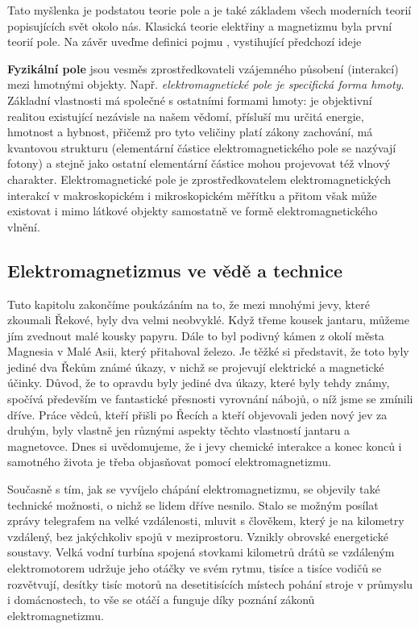       Tato myšlenka je podstatou teorie pole a je také základem všech moderních teorií popisujících
      svět okolo nás. Klasická teorie elektřiny a magnetizmu byla první teorií pole. Na závěr uveďme
      definici pojmu , vystihující předchozí ideje
      \begin{tcnote}
        \textbf{Fyzikální pole} jsou vesměs zprostředkovateli vzájemného působení (interakcí) mezi
        hmotnými objekty. Např. \emph{elektromagnetické pole je specifická forma hmoty}. Základní
        vlastnosti má společné s ostatními formami hmoty: je objektivní realitou existující
        nezávisle na našem vědomí, přísluší mu určitá energie, hmotnost a hybnost, přičemž pro tyto
        veličiny platí zákony zachování, má kvantovou strukturu (elementární částice
        elektromagnetického pole se nazývají fotony) a stejně jako ostatní elementární částice mohou
        projevovat též vlnový charakter. Elektromagnetické pole je zprostředkovatelem
        elektromagnetických interakcí v makroskopickém i mikroskopickém měřítku a přitom však může
        existovat i mimo látkové objekty samostatně ve formě elektromagnetického vlnění.
      \end{tcnote}               

    \subsection{Elektromagnetizmus ve vědě a technice}  
      Tuto kapitolu zakončíme poukázáním na to, že mezi mnohými jevy, které zkoumali Řekové, byly
      dva velmi neobvyklé. Když třeme kousek jantaru, můžeme jím zvednout malé kousky papyru. Dále
      to byl podivný kámen z okolí města Magnesia v Malé Asii, který přitahoval železo. Je těžké si
      představit, že toto byly jediné dva Řekům známé úkazy, v nichž se projevují elektrické a
      magnetické účinky. Důvod, že  to opravdu byly jediné dva úkazy, které byly tehdy známy,
      spočívá především ve fantastické přesnosti vyrovnání nábojů, o níž jsme se zmínili dříve.
      Práce vědců, kteří přišli po Řecích a kteří objevovali jeden nový jev za druhým, byly vlastně
      jen různými aspekty těchto vlastností jantaru a magnetovce. Dnes si uvědomujeme, že i jevy
      chemické interakce a konec konců i samotného života je třeba objasňovat pomocí
      elektromagnetizmu.

      Současně s tím, jak se vyvíjelo chápání elektromagnetizmu, se objevily také technické
      možnosti, o nichž se lidem dříve nesnilo. Stalo se možným posílat zprávy telegrafem na velké
      vzdálenosti, mluvit s člověkem, který je na kilometry vzdálený, bez jakýchkoliv spojů v
      meziprostoru. Vznikly obrovské energetické soustavy. Velká vodní turbína spojená stovkami
      kilometrů drátů se vzdáleným elektromotorem udržuje jeho otáčky ve svém rytmu, tisíce a tisíce
      vodičů se rozvětvují, desítky tisíc motorů na desetitisících místech pohání stroje v průmyslu
      i domácnostech, to vše se otáčí a funguje díky poznání zákonů elektromagnetizmu.

